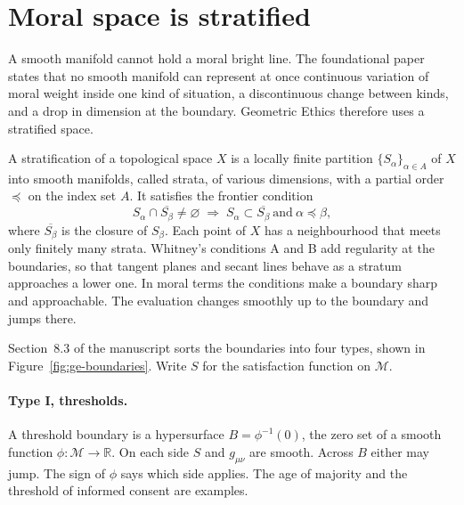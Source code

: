 \section{Moral space is stratified}\label{sec:ge-strata}

A smooth manifold cannot hold a moral bright line. The foundational paper states that no smooth
manifold can represent at once continuous variation of moral weight inside one kind of situation,
a discontinuous change between kinds, and a drop in dimension at the boundary.
Geometric Ethics therefore uses a stratified space.

A stratification of a topological space $X$ is a locally finite partition $\{S_\alpha\}_{\alpha\in
A}$ of $X$ into smooth manifolds, called strata, of various dimensions, with a partial order
$\preccurlyeq$ on the index set $A$. It satisfies the frontier condition
\begin{equation}
S_\alpha \cap \overline{S_\beta} \neq \varnothing \;\Longrightarrow\; S_\alpha \subset
\overline{S_\beta} \ \text{and}\ \alpha \preccurlyeq \beta ,
\label{eq:ge-frontier}
\end{equation}
where $\overline{S_\beta}$ is the closure of $S_\beta$. Each point of $X$ has a neighbourhood that
meets only finitely many strata.
Whitney's conditions A and B add regularity at the boundaries, so that tangent planes and secant
lines behave as a stratum approaches a lower one.\cite{whitney1965tangents}
In moral terms the conditions make a boundary sharp and approachable. The evaluation changes
smoothly up to the boundary and jumps there.

Section~8.3 of the manuscript sorts the boundaries into four types, shown in
Figure~\ref{fig:ge-boundaries}. Write $S$ for the satisfaction function on $\mathcal{M}$.

\paragraph{Type I, thresholds.} A threshold boundary is a hypersurface $B = \phi^{-1}(0)$, the zero
set of a smooth function $\phi\colon\mathcal{M}\to\mathbb{R}$. On each side $S$ and $g_{\mu\nu}$ are
smooth. Across $B$ either may jump. The sign of $\phi$ says which side applies. The age of majority
and the threshold of informed consent are examples.


